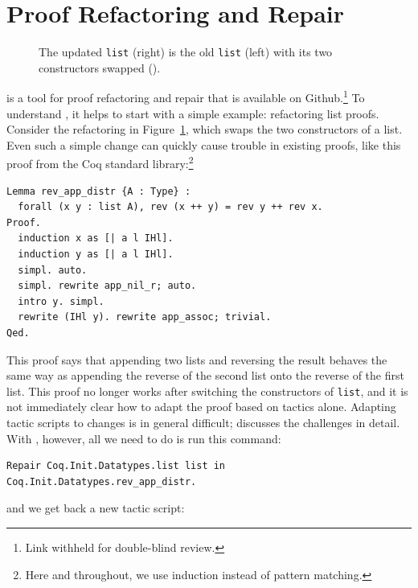 \section{Proof Refactoring and Repair}
\label{sec:overview}

\begin{figure}
\begin{minipage}{0.46\textwidth}
   
\end{minipage}
\hfill
\begin{minipage}{0.46\textwidth}
   
\end{minipage}
\caption{The updated \lstinline{list} (right) is the old \lstinline{list} (left) with its two constructors swapped ().}
\label{fig:listswap}
\end{figure}

\toolname is a tool for proof refactoring and repair that is available on Github.\footnote{Link withheld for double-blind review.}
To understand \toolname, it helps to start with a simple example: refactoring list proofs.
Consider the refactoring in Figure~\ref{fig:listswap}, which swaps the two constructors of a list.
Even such a simple change can quickly cause trouble in existing proofs, like this proof from the Coq standard library:\footnote{Here and throughout, we use induction instead of pattern matching.}

\begin{lstlisting}
Lemma rev_app_distr {A : Type} :
  forall (x y : list A), rev (x ++ y) = rev y ++ rev x.
Proof.
  induction x as [| a l IHl].
  induction y as [| a l IHl].
  simpl. auto.
  simpl. rewrite app_nil_r; auto.
  intro y. simpl.
  rewrite (IHl y). rewrite app_assoc; trivial.
Qed.
\end{lstlisting}
This proof says that appending two lists and reversing the result behaves the same way as appending
the reverse of the second list onto the reverse of the first list.
This proof no longer works after switching the constructors of \lstinline{list},
and it is not immediately clear how to adapt the proof based on tactics alone.
Adapting tactic scripts to changes is in general difficult; \citep{robert2018} 
discusses the challenges in detail.
With \toolname, however, all we need to do is run this command: %

\begin{lstlisting}
Repair Coq.Init.Datatypes.list list in Coq.Init.Datatypes.rev_app_distr.
\end{lstlisting}
and we get back a new tactic script:

